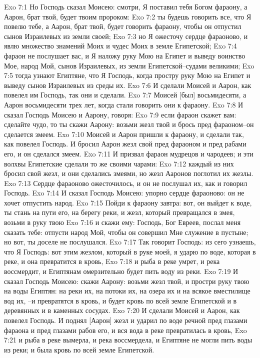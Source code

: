 Exo 7:1  Но Господь сказал Моисею: смотри, Я поставил тебя Богом фараону, а Аарон, брат твой, будет твоим пророком:
Exo 7:2  ты будешь говорить все, что Я повелю тебе, а Аарон, брат твой, будет говорить фараону, чтобы он отпустил сынов Израилевых из земли своей;
Exo 7:3  но Я ожесточу сердце фараоново, и явлю множество знамений Моих и чудес Моих в земле Египетской;
Exo 7:4  фараон не послушает вас, и Я наложу руку Мою на Египет и выведу воинство Мое, народ Мой, сынов Израилевых, из земли Египетской--судами великими;
Exo 7:5  тогда узнают Египтяне, что Я Господь, когда простру руку Мою на Египет и выведу сынов Израилевых из среды их.
Exo 7:6  И сделали Моисей и Аарон, как повелел им Господь, так они и сделали.
Exo 7:7  Моисей [был] восьмидесяти, а Аарон восьмидесяти трех лет, когда стали говорить они к фараону.
Exo 7:8  И сказал Господь Моисею и Аарону, говоря:
Exo 7:9  если фараон скажет вам: сделайте чудо, то ты скажи Аарону: возьми жезл твой и брось пред фараоном--он сделается змеем.
Exo 7:10  Моисей и Аарон пришли к фараону, и сделали так, как повелел Господь. И бросил Аарон жезл свой пред фараоном и пред рабами его, и он сделался змеем.
Exo 7:11  И призвал фараон мудрецов и чародеев; и эти волхвы Египетские сделали то же своими чарами:
Exo 7:12  каждый из них бросил свой жезл, и они сделались змеями, но жезл Ааронов поглотил их жезлы.
Exo 7:13  Сердце фараоново ожесточилось, и он не послушал их, как и говорил Господь.
Exo 7:14  И сказал Господь Моисею: упорно сердце фараоново: он не хочет отпустить народ.
Exo 7:15  Пойди к фараону завтра: вот, он выйдет к воде, ты стань на пути его, на берегу реки, и жезл, который превращался в змея, возьми в руку твою
Exo 7:16  и скажи ему: Господь, Бог Евреев, послал меня сказать тебе: отпусти народ Мой, чтобы он совершил Мне служение в пустыне; но вот, ты доселе не послушался.
Exo 7:17  Так говорит Господь: из сего узнаешь, что Я Господь: вот этим жезлом, который в руке моей, я ударю по воде, которая в реке, и она превратится в кровь,
Exo 7:18  и рыба в реке умрет, и река воссмердит, и Египтянам омерзительно будет пить воду из реки.
Exo 7:19  И сказал Господь Моисею: скажи Аарону: возьми жезл твой, и простри руку твою на воды Египтян: на реки их, на потоки их, на озера их и на всякое вместилище вод их, --и превратятся в кровь, и будет кровь по всей земле Египетской и в деревянных и в каменных сосудах.
Exo 7:20  И сделали Моисей и Аарон, как повелел Господь. И поднял [Аарон] жезл и ударил по воде речной пред глазами фараона и пред глазами рабов его, и вся вода в реке превратилась в кровь,
Exo 7:21  и рыба в реке вымерла, и река воссмердела, и Египтяне не могли пить воды из реки; и была кровь по всей земле Египетской.
